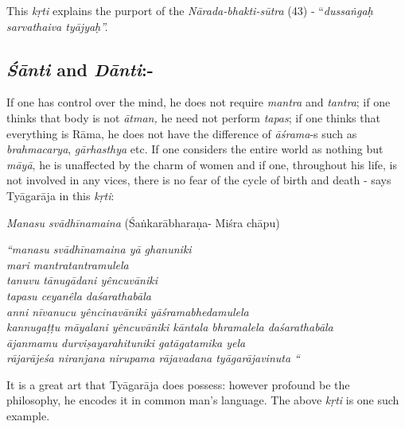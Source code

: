 This \textit{kṛti} explains the purport of the \textit{Nārada-bhakti-sūtra} (43) - “\textit{dussaṅgaḥ sarvathaiva tyājyaḥ”.}

\vspace{-.42cm}

\subsection*{\textit{Śānti} and \textit{Dānti}:-}

\vspace{-.3cm}

If one has control over the mind, he does not require \textit{mantra} and \textit{tantra}; if one thinks that body is not \textit{ātman,} he need not perform \textit{tapas}; if one thinks that everything is Rāma, he does not have the difference of \textit{āśrama}-s such as \textit{brahmacarya}, \textit{gārhasthya} etc. If one considers the entire world as nothing but \textit{māyā}, he is unaffected by the charm of women and if one, throughout his life, is not involved in any vices, there is no fear of the cycle of birth and death - says Tyāgarāja in this \textit{kṛti}:

\textit{Manasu svādhīnamaina} (Śaṅkarābharaṇa- Miśra chāpu)

\begin{longquote}
\textit{“manasu svādhīnamaina yā ghanuniki}\\ \textit{mari mantratantramulela}\\\textit{tanuvu tānugādani yêncuvāniki}\\\textit{tapasu ceyanêla daśarathabāla}\\ \textit{anni nīvanucu yêncinavāniki yāśramabhedamulela}\\ \textit{kannugaṭṭu māyalani yêncuvāniki kāntala bhramalela daśarathabāla}\\ \textit{ājanmamu durviṣayarahituniki gatāgatamika yela}\\ \textit{rājarājeśa niranjana nirupama rājavadana tyāgarājavinuta “}
\end{longquote}

It is a great art that Tyāgarāja does possess: however profound be the philosophy, he encodes it in common man’s language. The above \textit{kṛti} is one such example. 

